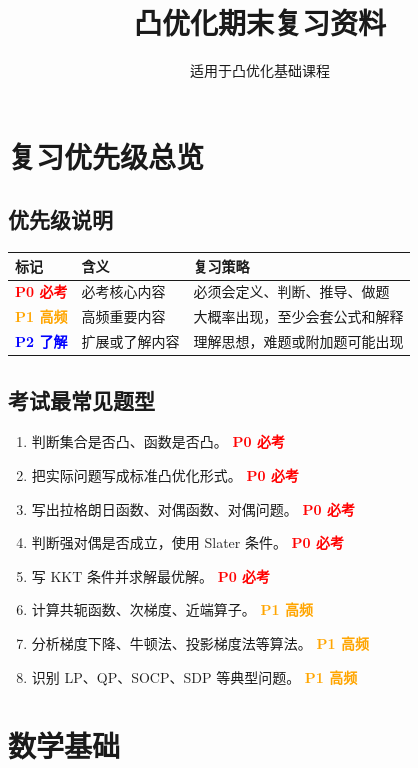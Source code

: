 \documentclass[11pt,a4paper]{ctexart}
\title{\textbf{凸优化期末复习资料}}
\author{适用于凸优化基础课程}
\date{}
\newcommand{\Pzero}{\textcolor{red}{\textbf{P0 必考}}}
\newcommand{\Pone}{\textcolor{orange}{\textbf{P1 高频}}}
\newcommand{\Ptwo}{\textcolor{blue}{\textbf{P2 了解}}}
\theoremstyle{definition}
\theoremstyle{plain}
\theoremstyle{remark}
\begin{document}
\maketitle
\tableofcontents

\newpage

\section{复习优先级总览}

\subsection*{优先级说明}

\begin{center}
\begin{tabular}{lll}
\toprule
标记 & 含义 & 复习策略 \\
\midrule
\Pzero & 必考核心内容 & 必须会定义、判断、推导、做题 \\
\Pone & 高频重要内容 & 大概率出现，至少会套公式和解释 \\
\Ptwo & 扩展或了解内容 & 理解思想，难题或附加题可能出现 \\
\bottomrule
\end{tabular}
\end{center}

\subsection*{考试最常见题型}

\begin{enumerate}[label=\arabic*.]
    \item 判断集合是否凸、函数是否凸。 \Pzero
    \item 把实际问题写成标准凸优化形式。 \Pzero
    \item 写出拉格朗日函数、对偶函数、对偶问题。 \Pzero
    \item 判断强对偶是否成立，使用 Slater 条件。 \Pzero
    \item 写 KKT 条件并求解最优解。 \Pzero
    \item 计算共轭函数、次梯度、近端算子。 \Pone
    \item 分析梯度下降、牛顿法、投影梯度法等算法。 \Pone
    \item 识别 LP、QP、SOCP、SDP 等典型问题。 \Pone
\end{enumerate}

\section{数学基础}
\end{document}
